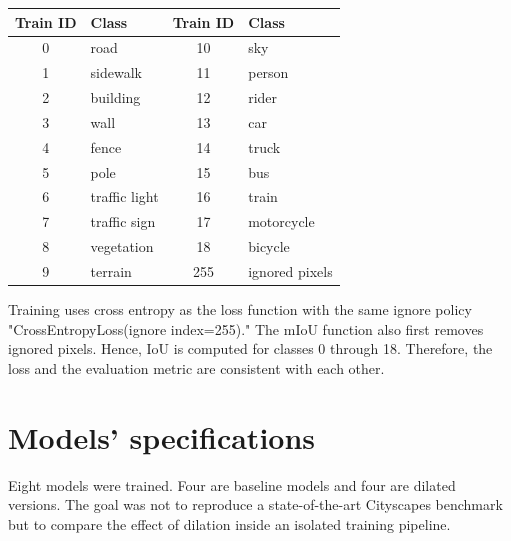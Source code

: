 \documentclass[12pt]{article}
\begin{document}
\begin{center}
\small
\begin{tabular}{|c|l||c|l|}
\hline
\textbf{Train ID} & \textbf{Class} & \textbf{Train ID} & \textbf{Class} \\
\hline
0 & road & 10 & sky \\
1 & sidewalk & 11 & person \\
2 & building & 12 & rider \\
3 & wall & 13 & car \\
4 & fence & 14 & truck \\
5 & pole & 15 & bus \\
6 & traffic light & 16 & train \\
7 & traffic sign & 17 & motorcycle \\
8 & vegetation & 18 & bicycle \\
9 & terrain & 255 & ignored pixels \\
\hline
\end{tabular}
\end{center}

Training uses cross entropy as the loss function with the same ignore policy "CrossEntropyLoss(ignore index=255)." The mIoU function also first removes ignored pixels. Hence, IoU is computed for classes 0 through 18. Therefore, the loss and the evaluation metric are consistent with each other.

\section{Models' specifications}
Eight models were trained. Four are baseline models and four are dilated versions. The goal was not to reproduce a state-of-the-art Cityscapes benchmark but to compare the effect of dilation inside an isolated training pipeline.
\end{document}
